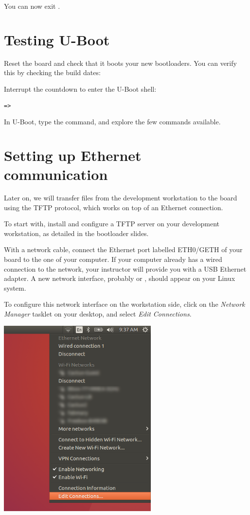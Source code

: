 You can now exit .

\section{Testing U-Boot}

Reset the board and check that it boots your new bootloaders. You can
verify this by checking the build dates:



Interrupt the countdown to enter the U-Boot shell:
\begin{verbatim}
=>
\end{verbatim}

In U-Boot, type the  command, and explore the few commands
available.

\section{Setting up Ethernet communication}

Later on, we will transfer files from the development workstation to
the board using the TFTP protocol, which works on top of an Ethernet
connection.

To start with, install and configure a TFTP server on your development
workstation, as detailed in the bootloader slides.

With a network cable, connect the Ethernet port labelled ETH0/GETH of
your board to the one of your computer. If your computer already has a
wired connection to the network, your instructor will provide you with
a USB Ethernet adapter. A new network interface, probably 
or , should appear on your Linux system.

To configure this network interface on the workstation side, click on
the {\em Network Manager} tasklet on your desktop, and select {\em
  Edit Connections}.

\begin{center}
\includegraphics[width=8cm]{labs/sysdev-u-boot/network-config-1.png}
\end{center}

